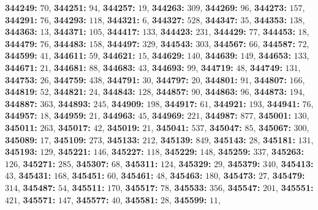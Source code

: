 \textsf{\bfseries 344249:} $70$, \textsf{\bfseries 344251:} $94$, \textsf{\bfseries 344257:} $19$, \textsf{\bfseries 344263:} $309$, \textsf{\bfseries 344269:} $96$, \textsf{\bfseries 344273:} $157$, \textsf{\bfseries 344291:} $76$, \textsf{\bfseries 344293:} $118$, \textsf{\bfseries 344321:} $6$, \textsf{\bfseries 344327:} $528$, \textsf{\bfseries 344347:} $35$, \textsf{\bfseries 344353:} $138$, \textsf{\bfseries 344363:} $13$, \textsf{\bfseries 344371:} $105$, \textsf{\bfseries 344417:} $133$, \textsf{\bfseries 344423:} $231$, \textsf{\bfseries 344429:} $77$, \textsf{\bfseries 344453:} $18$, \textsf{\bfseries 344479:} $76$, \textsf{\bfseries 344483:} $158$, \textsf{\bfseries 344497:} $329$, \textsf{\bfseries 344543:} $303$, \textsf{\bfseries 344567:} $66$, \textsf{\bfseries 344587:} $72$, \textsf{\bfseries 344599:} $41$, \textsf{\bfseries 344611:} $59$, \textsf{\bfseries 344621:} $15$, \textsf{\bfseries 344629:} $140$, \textsf{\bfseries 344639:} $149$, \textsf{\bfseries 344653:} $133$, \textsf{\bfseries 344671:} $21$, \textsf{\bfseries 344681:} $88$, \textsf{\bfseries 344683:} $43$, \textsf{\bfseries 344693:} $99$, \textsf{\bfseries 344719:} $48$, \textsf{\bfseries 344749:} $131$, \textsf{\bfseries 344753:} $26$, \textsf{\bfseries 344759:} $438$, \textsf{\bfseries 344791:} $30$, \textsf{\bfseries 344797:} $20$, \textsf{\bfseries 344801:} $91$, \textsf{\bfseries 344807:} $166$, \textsf{\bfseries 344819:} $52$, \textsf{\bfseries 344821:} $24$, \textsf{\bfseries 344843:} $128$, \textsf{\bfseries 344857:} $90$, \textsf{\bfseries 344863:} $96$, \textsf{\bfseries 344873:} $194$, \textsf{\bfseries 344887:} $363$, \textsf{\bfseries 344893:} $245$, \textsf{\bfseries 344909:} $198$, \textsf{\bfseries 344917:} $61$, \textsf{\bfseries 344921:} $193$, \textsf{\bfseries 344941:} $76$, \textsf{\bfseries 344957:} $18$, \textsf{\bfseries 344959:} $21$, \textsf{\bfseries 344963:} $45$, \textsf{\bfseries 344969:} $221$, \textsf{\bfseries 344987:} $877$, \textsf{\bfseries 345001:} $130$, \textsf{\bfseries 345011:} $263$, \textsf{\bfseries 345017:} $42$, \textsf{\bfseries 345019:} $21$, \textsf{\bfseries 345041:} $537$, \textsf{\bfseries 345047:} $85$, \textsf{\bfseries 345067:} $300$, \textsf{\bfseries 345089:} $17$, \textsf{\bfseries 345109:} $273$, \textsf{\bfseries 345133:} $212$, \textsf{\bfseries 345139:} $849$, \textsf{\bfseries 345143:} $28$, \textsf{\bfseries 345181:} $131$, \textsf{\bfseries 345193:} $129$, \textsf{\bfseries 345221:} $146$, \textsf{\bfseries 345227:} $118$, \textsf{\bfseries 345229:} $148$, \textsf{\bfseries 345259:} $337$, \textsf{\bfseries 345263:} $126$, \textsf{\bfseries 345271:} $285$, \textsf{\bfseries 345307:} $68$, \textsf{\bfseries 345311:} $124$, \textsf{\bfseries 345329:} $29$, \textsf{\bfseries 345379:} $340$, \textsf{\bfseries 345413:} $43$, \textsf{\bfseries 345431:} $168$, \textsf{\bfseries 345451:} $60$, \textsf{\bfseries 345461:} $48$, \textsf{\bfseries 345463:} $180$, \textsf{\bfseries 345473:} $27$, \textsf{\bfseries 345479:} $314$, \textsf{\bfseries 345487:} $54$, \textsf{\bfseries 345511:} $170$, \textsf{\bfseries 345517:} $78$, \textsf{\bfseries 345533:} $356$, \textsf{\bfseries 345547:} $201$, \textsf{\bfseries 345551:} $421$, \textsf{\bfseries 345571:} $147$, \textsf{\bfseries 345577:} $40$, \textsf{\bfseries 345581:} $28$, \textsf{\bfseries 345599:} $11$, 
